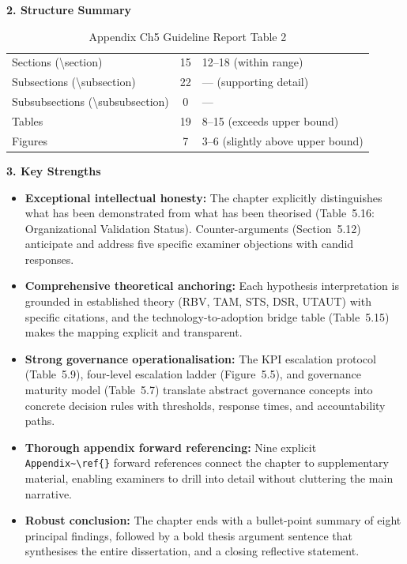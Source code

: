 \noindent\textbf{\color{ggunavy}2. Structure Summary}

\begin{table}[H]
\tablefontsize
\caption{Appendix Ch5 Guideline Report Table 2}
\tablestripes
\begin{tabularx}{\textwidth}{@{} l c L @{}}
\toprule
{} &  &  \\
\midrule
Sections (\textbackslash section) & 15 & 12--18 (within range) \\
Subsections (\textbackslash subsection) & 22 & --- (supporting detail) \\
Subsubsections (\textbackslash subsubsection) & 0 & --- \\
Tables & 19 & 8--15 (exceeds upper bound) \\
Figures & 7 & 3--6 (slightly above upper bound) \\
\bottomrule
\end{tabularx}
\end{table}

\noindent\textbf{\color{ggunavy}3. Key Strengths}

\begin{itemize}[nosep]
\item \textbf{Exceptional intellectual honesty:} The chapter explicitly distinguishes what has been demonstrated from what has been theorised (Table~5.16: Organizational Validation Status). Counter-arguments (Section~5.12) anticipate and address five specific examiner objections with candid responses.
\item \textbf{Comprehensive theoretical anchoring:} Each hypothesis interpretation is grounded in established theory (RBV, TAM, STS, DSR, UTAUT) with specific citations, and the technology-to-adoption bridge table (Table~5.15) makes the mapping explicit and transparent.
\item \textbf{Strong governance operationalisation:} The KPI escalation protocol (Table~5.9), four-level escalation ladder (Figure~5.5), and governance maturity model (Table~5.7) translate abstract governance concepts into concrete decision rules with thresholds, response times, and accountability paths.
\item \textbf{Thorough appendix forward referencing:} Nine explicit \texttt{Appendix\textasciitilde\textbackslash ref\{\}} forward references connect the chapter to supplementary material, enabling examiners to drill into detail without cluttering the main narrative.
\item \textbf{Robust conclusion:} The chapter ends with a bullet-point summary of eight principal findings, followed by a bold thesis argument sentence that synthesises the entire dissertation, and a closing reflective statement.
\end{itemize}

